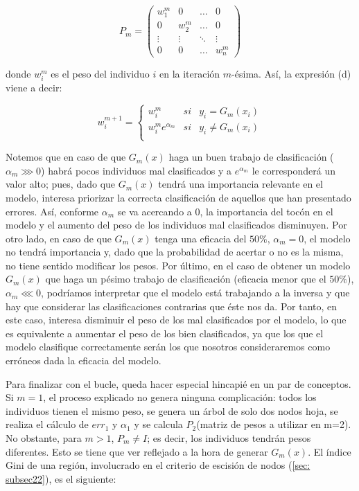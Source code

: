 \documentclass[12pt,twoside]{article}
\begin{document}
\begin{equation*}
P_m = 
\begin{pmatrix}
w_1^m & 0 & \dots & 0 \\
0 & w_2^m & \dots & 0 \\
\vdots & \vdots & \ddots & \vdots \\
0 & 0 & \dots & w_n^m
\end{pmatrix}
\end{equation*}

\noindent
donde $w_i^m$ es el peso del individuo $i$ en la iteración $m$-ésima. Así, la expresión (d) viene a decir:

\begin{equation*}
w_i^{m+1} =
\left\{
\begin{array}{crl}
w_i^m & si & y_i = G_m(x_i) \\
w_i^m e^{\alpha_m} & si & y_i \neq G_m(x_i) \\
\end{array}
\right.
\end{equation*}

Notemos que en caso de que $G_m(x)$ haga un buen trabajo de clasificación ($\alpha_m \ggg 0$) habrá pocos individuos mal clasificados y a $e^{\alpha_m}$ le corresponderá un valor alto; pues, dado que $G_m(x)$ tendrá una importancia relevante en el modelo, interesa priorizar la correcta clasificación de aquellos que han presentado errores. Así, conforme $\alpha_m$ se va acercando a 0, la importancia del tocón en el modelo y el aumento del peso de los individuos mal clasificados disminuyen. Por otro lado, en caso de que $G_m(x)$ tenga una eficacia del $50\%$, $\alpha_m = 0$, el modelo no tendrá importancia y, dado que la probabilidad de acertar o no es la misma, no tiene sentido modificar los pesos. Por último, en el caso de obtener un modelo $G_m(x)$ que haga un pésimo trabajo de clasificación (eficacia menor que el $50\%$), $\alpha_m \lll 0$, podríamos interpretar que el modelo está trabajando a la inversa y que hay que considerar las clasificaciones contrarias que éste nos da. Por tanto, en este caso, interesa disminuir el peso de los mal clasificados por el modelo, lo que es equivalente a aumentar el peso de los bien clasificados, ya que los que el modelo clasifique correctamente serán los que nosotros consideraremos como erróneos dada la eficacia del modelo.

Para finalizar con el bucle, queda hacer especial hincapié en un par de conceptos. Si $m=1$, el proceso explicado no genera ninguna complicación: todos los individuos tienen el mismo peso, se genera un árbol de solo dos nodos hoja, se realiza el cálculo de $err_1$ y $\alpha_1$ y se calcula $P_2$(matriz de pesos a utilizar en m=2). No obstante, para $m > 1$, $P_m \neq I$; es decir, los individuos tendrán pesos diferentes. Esto se tiene que ver reflejado a la hora de generar $G_m(x)$. El índice Gini de una región, involucrado en el criterio de escisión de nodos (\ref{sec: subsec22}), es el siguiente:
\end{document}

